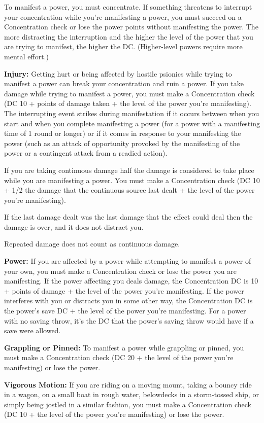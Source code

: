 \documentclass{article}
\begin{document}
To manifest a power, you must concentrate. If something threatens to interrupt 
your concentration while you're manifesting a power, you must succeed on a Concentration 
check or lose the power points without manifesting the power. The more distracting 
the interruption and the higher the level of the power that you are trying to manifest, 
the higher the DC. (Higher-level powers require more mental effort.)

\textbf{Injury:} Getting hurt or being affected by hostile psionics while trying 
to manifest a power can break your concentration and ruin a power. If you take 
damage while trying to manifest a power, you must make a Concentration check (DC 
10 + points of damage taken + the level of the power you're manifesting). The interrupting 
event strikes during manifestation if it occurs between when you start and when 
you complete manifesting a power (for a power with a manifesting time of 1 round 
or longer) or if it comes in response to your manifesting the power (such as an 
attack of opportunity provoked by the manifesting of the power or a contingent 
attack from a readied action).

If you are taking continuous damage half the damage is considered to take place 
while you are manifesting a power. You must make a Concentration check (DC 10 + 
1/2 the damage that the continuous source last dealt + the level of the power you're 
manifesting).

If the last damage dealt was the last damage that the effect could deal then the 
damage is over, and it does not distract you.

Repeated damage does not count as continuous damage.

\textbf{Power:} If you are affected by a power while attempting to manifest a power 
of your own, you must make a Concentration check or lose the power you are manifesting. 
If the power affecting you deals damage, the Concentration DC is 10 + points of 
damage + the level of the power you're manifesting. If the power interferes with 
you or distracts you in some other way, the Concentration DC is the power's save 
DC + the level of the power you're manifesting. For a power with no saving throw, 
it's the DC that the power's saving throw would have if a save were allowed.

\textbf{Grappling or Pinned:} To manifest a power while grappling or pinned, you 
must make a Concentration check (DC 20 + the level of the power you're manifesting) 
or lose the power.

\textbf{Vigorous Motion: }If you are riding on a moving mount, taking a bouncy 
ride in a wagon, on a small boat in rough water, belowdecks in a storm-tossed ship, 
or simply being jostled in a similar fashion, you must make a Concentration check 
(DC 10 + the level of the power you're manifesting) or lose the power.
\end{document}
